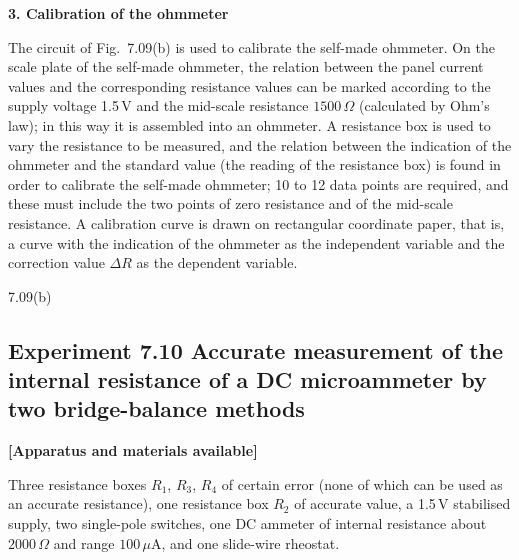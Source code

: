 \textbf{3. Calibration of the ohmmeter}

The circuit of Fig.~7.09(b) is used to calibrate the self-made ohmmeter. On the scale plate of the self-made ohmmeter, the relation between the panel current values and the corresponding resistance values can be marked according to the supply voltage 1.5\,V and the mid-scale resistance $1500\,\Omega$ (calculated by Ohm's law); in this way it is assembled into an ohmmeter. A resistance box is used to vary the resistance to be measured, and the relation between the indication of the ohmmeter and the standard value (the reading of the resistance box) is found in order to calibrate the self-made ohmmeter; 10 to 12 data points are required, and these must include the two points of zero resistance and of the mid-scale resistance. A calibration curve is drawn on rectangular coordinate paper, that is, a curve with the indication of the ohmmeter as the independent variable and the correction value $\Delta R$ as the dependent variable.

\begin{figbox}{7.09(b)}
\end{figbox}

\subsection*{Experiment 7.10 \quad Accurate measurement of the internal resistance of a DC microammeter by two bridge-balance methods}

\textbf{[Apparatus and materials available]}

Three resistance boxes $R_1$, $R_3$, $R_4$ of certain error (none of which can be used as an accurate resistance), one resistance box $R_2$ of accurate value, a 1.5\,V stabilised supply, two single-pole switches, one DC ammeter of internal resistance about $2000\,\Omega$ and range $100\,\mu$A, and one slide-wire rheostat.


